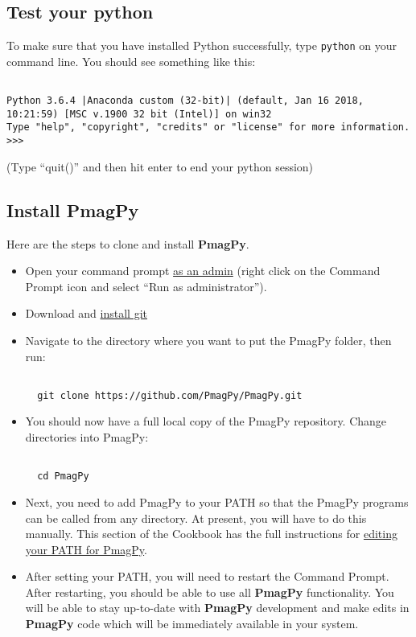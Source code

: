 \documentclass[11pt]{article}
\begin{document}
\subsection{Test your python}

To make sure that you have installed Python successfully, type \texttt{python} on your command line.  You should see something like this: \begin{verbatim}

Python 3.6.4 |Anaconda custom (32-bit)| (default, Jan 16 2018, 10:21:59) [MSC v.1900 32 bit (Intel)] on win32
Type "help", "copyright", "credits" or "license" for more information.
>>>\end{verbatim}
(Type ``quit()'' and then hit enter to end your python session)



\subsection{Install PmagPy}

Here are the steps to clone and install {\bf PmagPy}.

\begin{itemize}

\item Open your command prompt \href{http://www.thewindowsclub.com/how-to-run-command-prompt-as-an-administrator}{as an admin} (right click on the Command Prompt icon and select ``Run as administrator'').

\item Download and \href{https://git-scm.com/downloads}{install git}

  \item Navigate to the directory where you want to put the PmagPy folder, then run:

\begin{verbatim}

  git clone https://github.com/PmagPy/PmagPy.git
\end{verbatim}

\item You should now have a full local copy of the PmagPy repository.  Change directories into PmagPy:

\begin{verbatim}

  cd PmagPy
\end{verbatim}


\item Next, you need to add PmagPy to your PATH so that the PmagPy programs can be called from any directory.  At present, you will have to do this manually.  This section of the Cookbook has the full instructions for \href{https://earthref.org/PmagPy/cookbook/#setting_path}{editing your PATH for PmagPy}.

\item After setting your PATH, you will need to restart the Command Prompt.  After restarting, you should be able to use all {\bf PmagPy} functionality.  You will be able to stay up-to-date with {\bf PmagPy} development and make edits in {\bf PmagPy} code which will be immediately available in your system.

\end{itemize}
\end{document}
